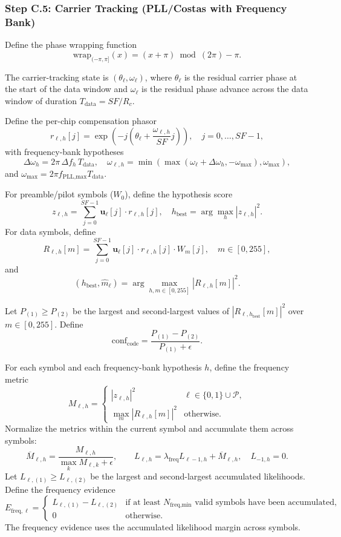 \documentclass[11pt]{article}
\begin{document}
\subsubsection{Step C.5: Carrier Tracking (PLL/Costas with Frequency Bank)}

Define the phase wrapping function
\[
  \mathrm{wrap}_{(-\pi,\pi]}(x)=(x+\pi)\bmod (2\pi)-\pi.
\]

The carrier-tracking state is $(\theta_\ell,\omega_\ell)$, where $\theta_\ell$ is the residual carrier phase at the start of the data window and $\omega_\ell$ is the residual phase advance across the data window of duration $T_{\text{data}}=\mathit{SF}/R_c$.

Define the per-chip compensation phasor
\[
  r_{\ell,h}[j]=\exp\left(-j\left(\theta_\ell + \frac{\omega_{\ell,h}}{\mathit{SF}}j\right)\right),\quad j=0,\dots,\mathit{SF}-1,
\]
with frequency-bank hypotheses
\[
  \Delta\omega_h = 2\pi\,\Delta f_h\,T_{\text{data}},\quad
  \omega_{\ell,h}=\min\!\left(\max\!\left(\omega_\ell+\Delta\omega_h,-\omega_{\max}\right),\omega_{\max}\right),
\]
and $\omega_{\max}=2\pi f_{\text{PLL,max}}T_{\text{data}}$.

For preamble/pilot symbols ($W_0$), define the hypothesis score
\[
  z_{\ell,h}=\sum_{j=0}^{\mathit{SF}-1}\mathbf{u}_\ell[j]\cdot r_{\ell,h}[j],\quad
  h_{\text{best}}=\arg\max_h |z_{\ell,h}|^2.
\]
For data symbols, define
\[
  R_{\ell,h}[m]=\sum_{j=0}^{\mathit{SF}-1}\mathbf{u}_\ell[j]\cdot r_{\ell,h}[j]\cdot W_m[j],\quad m\in[0,255],
\]
and
\[
  (h_{\text{best}},\hat m_\ell)=\arg\max_{h,m\in[0,255]} |R_{\ell,h}[m]|^2.
\]

Let $P_{(1)}\ge P_{(2)}$ be the largest and second-largest values of $|R_{\ell,h_{\text{best}}}[m]|^2$ over $m\in[0,255]$. Define
\[
  \mathrm{conf}_{\text{code}}=\frac{P_{(1)}-P_{(2)}}{P_{(1)}+\epsilon}.
\]

For each symbol and each frequency-bank hypothesis $h$, define the frequency metric
\[
  M_{\ell,h}=\begin{cases}
    |z_{\ell,h}|^2 & \ell\in\{0,1\}\cup\mathcal{P},\\
    \max_m |R_{\ell,h}[m]|^2 & \text{otherwise}.
  \end{cases}
\]
Normalize the metrics within the current symbol and accumulate them across symbols:
\[
  \overline M_{\ell,h}=\frac{M_{\ell,h}}{\max_k M_{\ell,k}+\epsilon},\qquad
  L_{\ell,h}=\lambda_{\text{freq}}L_{\ell-1,h}+\overline M_{\ell,h},
  \quad L_{-1,h}=0.
\]
Let $L_{\ell,(1)}\ge L_{\ell,(2)}$ be the largest and second-largest accumulated likelihoods. Define the frequency evidence
\[
  E_{\text{freq},\ell}=\begin{cases}
    L_{\ell,(1)}-L_{\ell,(2)} & \text{if at least }N_{\text{freq,min}}\text{ valid symbols have been accumulated},\\
    0 & \text{otherwise}.
  \end{cases}
\]
The frequency evidence uses the accumulated likelihood margin across symbols.
\end{document}
